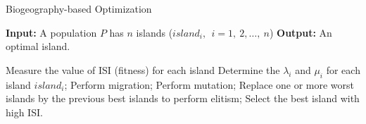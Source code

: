 \begin{algorithm}
\caption{\fontsize{10}{12} \selectfont Biogeography-based Optimization \cite{ma2010}}
\label{algo:BBO}
\footnotesize
\begin{algorithmic}
\STATE \textbf{Input:} A population $P$ has $n$ islands ($island_i,\ \ i=1,\ 2,\dots, \ n$)
\STATE\textbf{Output:} An optimal island.

 \STATE Measure the value of ISI (fitness) for each island
    \STATE  Determine the $\lambda_i$ and $\mu_i$ for each island $island_i$;
    \STATE Perform migration;
    \STATE Perform mutation;
    \STATE Replace one or more worst islands by the previous best islands to perform elitism;
\ENDWHILE
\STATE Select the best island with high ISI.
\end{algorithmic}
\end{algorithm}


